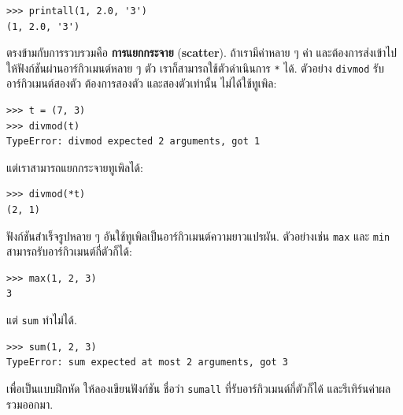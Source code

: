 \begin{verbatim}
>>> printall(1, 2.0, '3')
(1, 2.0, '3')
\end{verbatim}
%
%
ตรงข้ามกับการรวบรวมคือ \textbf{การแยกกระจาย} (\textbf{scatter}).
ถ้าเรามีค่าหลาย ๆ ค่า และต้องการส่งเข้าไปให้ฟังก์ชันผ่านอาร์กิวเมนต์หลาย ๆ ตัว
เราก็สามารถใช้ตัวดำเนินการ \texttt{*} ได้.
ตัวอย่าง \texttt{divmod} รับอาร์กิวเมนต์สองตัว ต้องการสองตัว และสองตัวเท่านั้น
ไม่ได้ใช้ทูเพิล:
%


\begin{verbatim}
>>> t = (7, 3)
>>> divmod(t)
TypeError: divmod expected 2 arguments, got 1
\end{verbatim}
%
%
แต่เราสามารถแยกกระจายทูเพิลได้:

\begin{verbatim}
>>> divmod(*t)
(2, 1)
\end{verbatim}
%
%
ฟังก์ชันสำเร็จรูปหลาย ๆ อันใช้ทูเพิลเป็นอาร์กิวเมนต์ความยาวแปรผัน.
ตัวอย่างเช่น \texttt{max} และ \texttt{min} สามารถรับอาร์กิวเมนต์กี่ตัวก็ได้:


\begin{verbatim}
>>> max(1, 2, 3)
3
\end{verbatim}
%
แต่ \texttt{sum} ทำไม่ได้.

\begin{verbatim}
>>> sum(1, 2, 3)
TypeError: sum expected at most 2 arguments, got 3
\end{verbatim}
%
เพื่อเป็นแบบฝึกหัด ให้ลองเขียนฟังก์ชัน ชื่อว่า \texttt{sumall} ที่รับอาร์กิวเมนต์กี่ตัวก็ได้ และรีเทิร์นค่าผลรวมออกมา.

